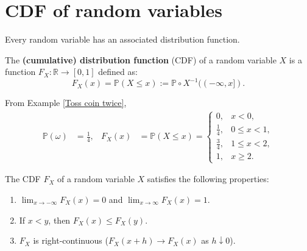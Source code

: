 \documentclass{huhtakm-template-book}
\newcommand{\prob}{\mathbb{P}}
\begin{document}
\section{CDF of random variables}
    Every random variable has an associated distribution function.
    \begin{defn}
        The \textbf{(cumulative) distribution function} (CDF) of a random variable $X$ is a function $F_{X}:\mathbb{R}\to [0,1]$ defined as:
        \begin{equation*}
            F_{X}(x)=\prob(X\leq x):=\prob\circ X^{-1}((-\infty,x]).
        \end{equation*}
    \end{defn}
    \begin{eg}
        From Example \ref{Toss coin twice},
        \begin{align*}
            \prob(\omega)&=\frac{1}{4}, & F_{X}(x)&=\prob(X\leq x)=\begin{cases}
                0, &x<0,\\
                \frac{1}{4}, &0\leq x<1,\\
                \frac{3}{4}, &1\leq x<2,\\
                1, &x\geq 2.
            \end{cases}
        \end{align*}
    \end{eg}
    \begin{lem}
        The CDF $F_{X}$ of a random variable $X$ satisfies the following properties:
        \begin{enumerate}
            \item $\lim_{x\to -\infty}F_{X}(x)=0$ and $\lim_{x\to\infty}F_{X}(x)=1$.
            \item If $x<y$, then $F_{X}(x)\leq F_{X}(y)$.
            \item $F_{X}$ is right-continuous ($F_{X}(x+h)\to F_{X}(x)$ as $h\downarrow 0$).
        \end{enumerate}
    \end{lem}
\end{document}
